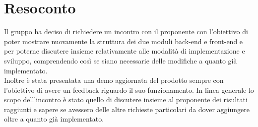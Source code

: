 \section{Resoconto}
Il gruppo ha deciso di richiedere un incontro con il proponente con l'obiettivo di poter mostrare nuovamente la struttura dei due moduli back-end e front-end e per poterne discutere insieme relativamente alle modalità di implementazione e sviluppo, comprendendo così se siano necessarie delle modifiche a quanto già implementato. \\
Inoltre è stata presentata una demo aggiornata del prodotto sempre con l'obiettivo di avere un feedback riguardo il suo funzionamento.
In linea generale lo scopo dell'incontro è stato quello di discutere insieme al proponente dei risultati raggiunti e sapere se avessero delle altre richieste particolari da dover aggiungere oltre a quanto già implementato.